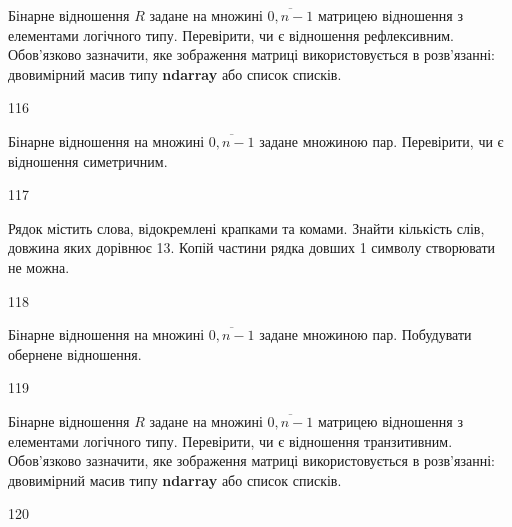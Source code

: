 Бінарне відношення $R$ задане на множині $\overline{0,n-1}$ матрицею відношення з елементами логічного типу. Перевірити, чи є відношення рефлексивним. Обов'язково зазначити, яке зображення матриці використовується в розв'язанні: двовимірний масив типу \textbf{ndarray} або список списків.
\\\par
116 














Бінарне відношення на множині $\overline{0,n-1}$ задане множиною пар. Перевірити, чи є відношення симетричним.
\\\par
117 














Рядок містить слова, відокремлені крапками та комами. Знайти кількість слів, довжина яких дорівнює 13. Копій частини рядка довших 1 символу створювати не можна.
\\\par
118 














Бінарне відношення на множині $\overline{0,n-1}$ задане множиною пар. Побудувати обернене відношення.
\\\par
119 














Бінарне відношення $R$ задане на множині $\overline{0,n-1}$ матрицею відношення з елементами логічного типу. Перевірити, чи є відношення транзитивним. Обов'язково зазначити, яке зображення матриці використовується в розв'язанні: двовимірний масив типу \textbf{ndarray} або список списків.
\\\par
120 














